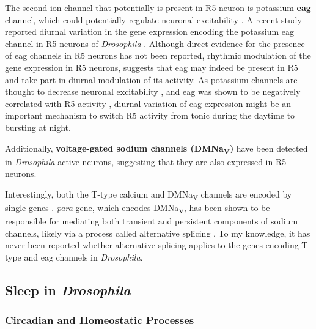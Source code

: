 \documentclass[../main.tex]{subfiles}
\begin{document}
The second ion channel that potentially is present in R5 neuron is potassium \textbf{\gls{eag}} channel, which could potentially regulate neuronal excitability \parencite{bruggemannEtheragogoEncodesVoltagegated1993}. A recent study reported diurnal variation in the gene expression encoding the potassium \gls{eag} channel in R5 neurons of \textit{Drosophila} \parencite{doppSinglecellTranscriptomicsReveals2024}. Although direct evidence for the presence of \gls{eag} channels in R5 neurons has not been reported, rhythmic modulation of the gene expression in R5 neurons, suggests that \gls{eag} may indeed be present in R5 and take part in diurnal modulation of its activity.
As potassium channels are thought to decrease neuronal excitability \parencite{bruggemannEtheragogoEncodesVoltagegated1993}, and \gls{eag} was shown to be negatively correlated with R5 activity \parencite{doppSinglecellTranscriptomicsReveals2024}, diurnal variation of \gls{eag} expression might be an important mechanism to switch R5 activity from tonic during the daytime to bursting at night.

Additionally, \textbf{voltage-gated sodium channels (DMNa\textsubscript{V})} have been detected in \textit{Drosophila} active neurons, suggesting that they are also expressed in R5 neurons.

Interestingly, both the T-type calcium and DMNa\textsubscript{V} channels are encoded by single genes \parencite{jeongCaa1TFlyTtype2015,ravenscroftDrosophilaVoltageGatedSodium2020}. \textit{para} gene, which encodes DMNa\textsubscript{V}, has been shown to be responsible for mediating both transient and persistent components of sodium channels, likely via a process called alternative splicing \parencite{linAlternativeSplicingVoltageGated2009}. To my knowledge, it has never been reported whether alternative splicing applies to the genes encoding T-type and \gls{eag} channels in \textit{Drosophila}.



\subsection{Sleep in \textit{Drosophila}}

\subsubsection{Circadian and Homeostatic Processes}
\end{document}
